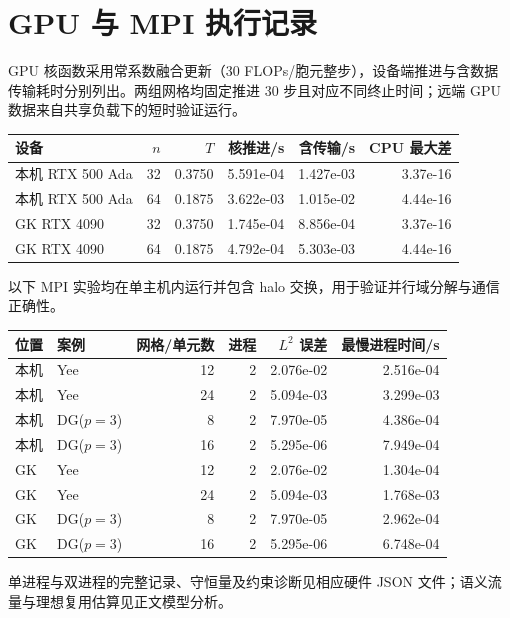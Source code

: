 \section{GPU 与 MPI 执行记录}
GPU 核函数采用常系数融合更新（30 FLOPs/胞元整步），设备端推进与含数据传输耗时分别列出。两组网格均固定推进 30 步且对应不同终止时间；远端 GPU 数据来自共享负载下的短时验证运行。
\begin{center}\small\begin{tabular}{lrrrrr}\toprule
设备 & $n$ & $T$ & 核推进/s & 含传输/s & CPU 最大差\\\midrule
本机 RTX 500 Ada & 32 & 0.3750 & 5.591e-04 & 1.427e-03 & 3.37e-16\\
本机 RTX 500 Ada & 64 & 0.1875 & 3.622e-03 & 1.015e-02 & 4.44e-16\\
GK RTX 4090 & 32 & 0.3750 & 1.745e-04 & 8.856e-04 & 3.37e-16\\
GK RTX 4090 & 64 & 0.1875 & 4.792e-04 & 5.303e-03 & 4.44e-16\\
\bottomrule\end{tabular}\end{center}
以下 MPI 实验均在单主机内运行并包含 halo 交换，用于验证并行域分解与通信正确性。
\begin{center}\small\begin{tabular}{llrrrr}\toprule
位置 & 案例 & 网格/单元数 & 进程 & $L^2$ 误差 & 最慢进程时间/s\\\midrule
本机 & Yee & 12 & 2 & 2.076e-02 & 2.516e-04\\
本机 & Yee & 24 & 2 & 5.094e-03 & 3.299e-03\\
本机 & DG($p=3$) & 8 & 2 & 7.970e-05 & 4.386e-04\\
本机 & DG($p=3$) & 16 & 2 & 5.295e-06 & 7.949e-04\\
GK & Yee & 12 & 2 & 2.076e-02 & 1.304e-04\\
GK & Yee & 24 & 2 & 5.094e-03 & 1.768e-03\\
GK & DG($p=3$) & 8 & 2 & 7.970e-05 & 2.962e-04\\
GK & DG($p=3$) & 16 & 2 & 5.295e-06 & 6.748e-04\\
\bottomrule\end{tabular}\end{center}
单进程与双进程的完整记录、守恒量及约束诊断见相应硬件 JSON 文件；语义流量与理想复用估算见正文模型分析。
